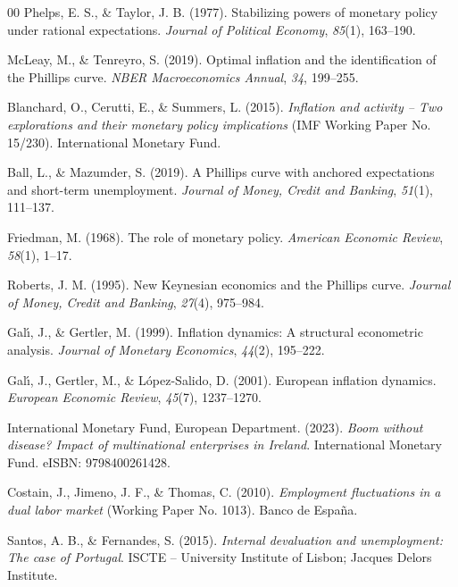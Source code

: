 \documentclass[preprint,10pt,authoryear]{elsarticle}
\begin{document}
\begin{thebibliography}{00}
Phelps, E. S., \& Taylor, J. B. (1977). Stabilizing powers of monetary policy under rational expectations. \textit{Journal of Political Economy}, \textit{85}(1), 163--190.

McLeay, M., \& Tenreyro, S. (2019). Optimal inflation and the identification of the Phillips curve. \textit{NBER Macroeconomics Annual}, \textit{34}, 199--255. 

Blanchard, O., Cerutti, E., \& Summers, L. (2015). \textit{Inflation and activity -- Two explorations and their monetary policy implications} (IMF Working Paper No. 15/230). International Monetary Fund.

Ball, L., \& Mazumder, S. (2019). A Phillips curve with anchored expectations and short-term unemployment. \textit{Journal of Money, Credit and Banking}, \textit{51}(1), 111--137.

Friedman, M. (1968). The role of monetary policy. \textit{American Economic Review}, \textit{58}(1), 1--17.

Roberts, J. M. (1995). New Keynesian economics and the Phillips curve. \textit{Journal of Money, Credit and Banking}, \textit{27}(4), 975--984.

Gal\'{\i}, J., \& Gertler, M. (1999). Inflation dynamics: A structural econometric analysis. \textit{Journal of Monetary Economics}, \textit{44}(2), 195--222.

Gal\'{\i}, J., Gertler, M., \& L\'opez-Salido, D. (2001). European inflation dynamics. \textit{European Economic Review}, \textit{45}(7), 1237--1270.

International Monetary Fund, European Department. (2023). \textit{Boom without disease? Impact of multinational enterprises in Ireland}. International Monetary Fund. eISBN: 9798400261428.


Costain, J., Jimeno, J. F., \& Thomas, C. (2010). \textit{Employment fluctuations in a dual labor market} (Working Paper No. 1013). Banco de Espa\~na.

Santos, A. B., \& Fernandes, S. (2015). \textit{Internal devaluation and unemployment: The case of Portugal}. ISCTE -- University Institute of Lisbon; Jacques Delors Institute.



\end{thebibliography}
\end{document}

